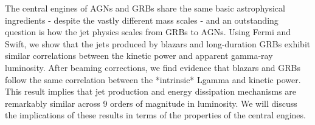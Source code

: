 


\bigskip



\bigskip

\noindent The central engines of AGNs and GRBs share the same basic astrophysical ingredients - despite the vastly different mass scales - and an outstanding question is how the jet physics scales from GRBs to AGNs. Using Fermi and Swift, we show that the jets produced by blazars and long-duration GRBs exhibit similar correlations between the kinetic power and apparent gamma-ray luminosity. After beaming corrections, we find evidence that blazars and GRBs follow the same correlation between the *intrinsic* Lgamma and kinetic power. This result implies that jet production and energy dissipation mechanisms are remarkably similar across 9 orders of magnitude in luminosity. We will discuss the implications of these results in terms of the properties of the central engines.

